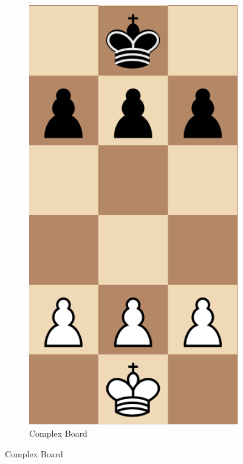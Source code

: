 \documentclass{article}
\begin{document}
\begin{figure}[h]
\begin{subfigure}{0.26\textwidth}
                \includegraphics[width=\linewidth]{complex_board}
                \caption{Complex Board}
        \end{subfigure}
 		\label{fig:5}
 		\end{figure}
\end{document}
